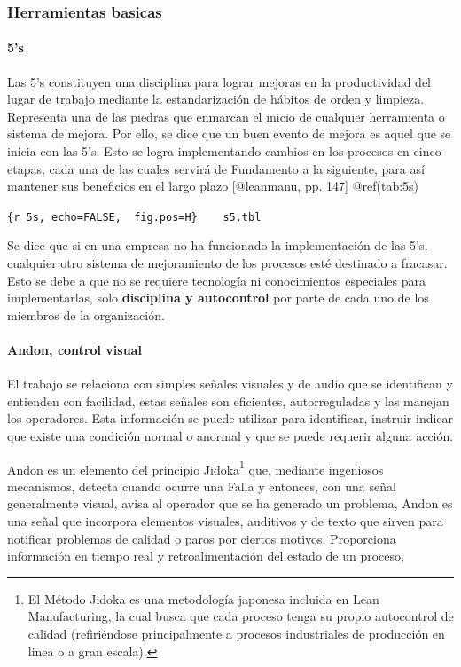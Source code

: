 \documentclass[11pt]{article}
\begin{document}
\hypertarget{herramientas-basicas}{%
\subsubsection{Herramientas basicas}\label{herramientas-basicas}}

\hypertarget{s}{%
\paragraph{5's}\label{s}}

Las 5's constituyen una disciplina para lograr mejoras en la
productividad del lugar de trabajo mediante la estandarización de
hábitos de orden y limpieza. Representa una de las piedras que enmarcan
el inicio de cualquier herramienta o sistema de mejora. Por ello, se
dice que un buen evento de mejora es aquel que se inicia con las 5's.
Esto se logra implementando cambios en los procesos en cinco etapas,
cada una de las cuales servirá de Fundamento a la siguiente, para así
mantener sus beneficios en el largo plazo {[}@leanmanu, pp. 147{]}
@ref(tab:5s)

\texttt{\{r\ 5s,\ echo=FALSE,\ \ fig.pos=\textquotesingle{}H\textquotesingle{}\}\ \ \ \ s5.tbl}

Se dice que si en una empresa no ha funcionado la implementación de las
5's, cualquier otro sistema de mejoramiento de los procesos esté
destinado a fracasar. Esto se debe a que no se requiere tecnología ni
conocimientos especiales para implementarlas, solo \textbf{disciplina y
autocontrol} por parte de cada uno de los miembros de la organización.

\hypertarget{andon-control-visual}{%
\paragraph{Andon, control visual}\label{andon-control-visual}}

El trabajo se relaciona con simples señales visuales y de audio que se
identifican y entienden con facilidad, estas señales son eficientes,
autorreguladas y las manejan los operadores. Esta información se puede
utilizar para identificar, instruir indicar que existe una condición
normal o anormal y que se puede requerir alguna acción.

Andon es un elemento del principio Jidoka\footnote{El Método Jidoka es
  una metodología japonesa incluida en Lean Manufacturing, la cual busca
  que cada proceso tenga su propio autocontrol de calidad (refiriéndose
  principalmente a procesos industriales de producción en linea o a gran
  escala).} que, mediante ingeniosos mecanismos, detecta cuando ocurre
una Falla y entonces, con una señal generalmente visual, avisa al
operador que se ha generado un problema, Andon es una señal que
incorpora elementos visuales, auditivos y de texto que sirven para
notificar problemas de calidad o paros por ciertos motivos. Proporciona
información en tiempo real y retroalimentación del estado de un proceso,
\end{document}
